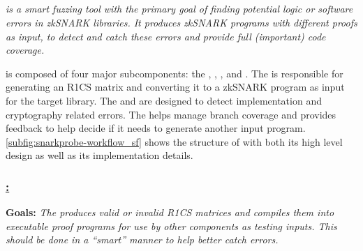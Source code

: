 


\subsection{\SnarkFuzzer}
\label{subsec:snarkprobe-snarkfuzzer}

\emph{\SnarkFuzzer is a smart fuzzing tool with the primary goal of finding potential logic or software errors in zkSNARK libraries. It produces zkSNARK programs with different proofs as input, to detect and catch these errors and provide full (important) code coverage.}


\SnarkFuzzer is composed of four major subcomponents: the , \branchmodel, , and . The  is responsible for generating an R1CS matrix and converting it to a zkSNARK program as input for the target library.  The  and  are designed to detect implementation and cryptography related errors. The \branchmodel helps manage branch coverage and provides feedback to help \SnarkFuzzer decide if it needs to generate another input program. \autoref{subfig:snarkprobe-workflow_sf} shows the structure of \SnarkFuzzer with both its high level design as well as its implementation details.

\subsubsection*{\underline{\SnarkFuzzer: }}
\label{subsec:snarkprobe-input-generator}

\textbf{Goals: } \emph{The  produces valid or invalid R1CS matrices and compiles them into executable proof programs for use by other components as testing inputs.  This should be done in a ``smart'' manner to help better catch errors.}

